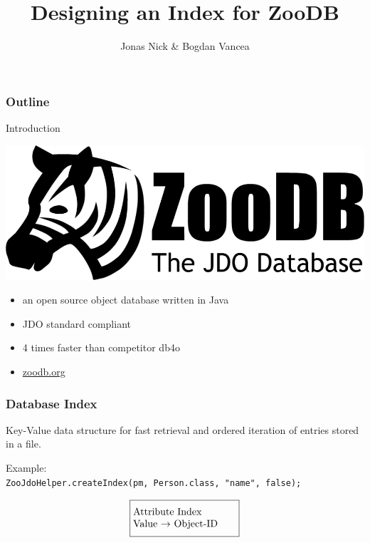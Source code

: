 \documentclass{beamer}
\title{Designing an Index for ZooDB}
\author{Jonas Nick \& Bogdan Vancea}
\begin{document}
  \frame{\titlepage}
  \begin{frame}
    \frametitle{Outline}
    \tableofcontents[hideallsubsections]
  \end{frame}

  \begin{section}{Introduction}
    \begin{frame}
      \vspace{-4em}
      \hspace{-2em}
      \includegraphics[scale=0.1]{images/zoodb_logo.png}
      \vspace{3em}
      \hspace{2em}
      \begin{itemize}
        \item an open source object database written in Java
        \item JDO standard compliant
        \item 4 times faster than competitor db4o
        \item \url{zoodb.org}
      \end{itemize}

    \end{frame}
    \begin{frame}
      \frametitle{Database Index}
      \begin{block}{}
          Key-Value data structure for fast retrieval and ordered iteration of entries stored in a file.
      \end{block}
      \vspace{1em}
      \pause
      Example: \\
      \texttt{ZooJdoHelper.createIndex(pm, Person.class, "name", false);}
      \pause
      \begin{align*}
      \fbox{\parbox[t][3em][c]{0.29\textwidth}{Attribute Index\\ Value $\rightarrow$ Object-ID} }
      \end{align*}
      \pause
      \vspace{-0.9cm}
      \begin{center}
      \end{center}
    \end{frame}


\end{section}
\end{document}
